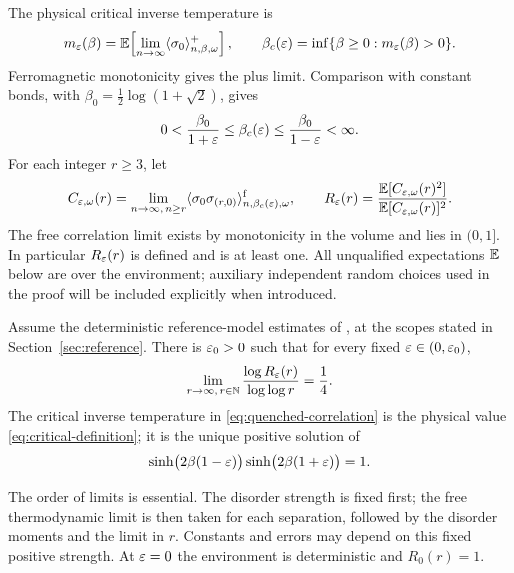 The physical critical inverse temperature is
\begin{equation}\label{eq:critical-definition}
 m_\varepsilon(\beta)=\mathbb E\!\left[\lim_{n\to\infty}
       \langle\sigma_0\rangle^+_{n,\beta,\omega}\right],
 \qquad
 \beta_c(\varepsilon)=\inf\{\beta\ge0:m_\varepsilon(\beta)>0\}.
\end{equation}
Ferromagnetic monotonicity gives the plus limit. Comparison with constant
bonds, with $\beta_0=\tfrac12\log(1+\sqrt2)$, gives
\[
 0<\frac{\beta_0}{1+\varepsilon}\le\beta_c(\varepsilon)
       \le\frac{\beta_0}{1-\varepsilon}<\infty.
\]
For each integer $r\ge3$, let
\begin{equation}\label{eq:quenched-correlation}
 C_{\varepsilon,\omega}(r)=\lim_{n\to\infty,\,n\ge r}
       \langle\sigma_0\sigma_{(r,0)}\rangle^{\mathrm f}
                   _{n,\beta_c(\varepsilon),\omega},
 \qquad
 R_\varepsilon(r)=\frac{\mathbb E[C_{\varepsilon,\omega}(r)^2]}
                 {\mathbb E[C_{\varepsilon,\omega}(r)]^2}.
\end{equation}
The free correlation limit exists by monotonicity in the volume and lies
in $(0,1]$. In particular $R_\varepsilon(r)$ is defined and is at least one.
All unqualified expectations $\mathbb E$ below are over the environment; auxiliary
independent random choices used in the proof will be included explicitly
when introduced.

\begin{theorem}\label{thm:main}
Assume the deterministic reference-model estimates of
\cite{ReferenceIsing}, at the scopes stated in Section~\ref{sec:reference}.
There is $\varepsilon_0>0$ such that for every fixed $\varepsilon\in(0,\varepsilon_0)$,
\begin{equation}\label{eq:main-limit}
 \lim_{r\to\infty,\,r\in\mathbb N}
       \frac{\log R_\varepsilon(r)}{\log\log r}=\frac14.
\end{equation}
The critical inverse temperature in \eqref{eq:quenched-correlation} is
the physical value \eqref{eq:critical-definition}; it is the unique positive
solution of
\begin{equation}\label{eq:critical-curve}
 \sinh\bigl(2\beta(1-\varepsilon)\bigr)
 \sinh\bigl(2\beta(1+\varepsilon)\bigr)=1.
\end{equation}
\end{theorem}

The order of limits is essential. The disorder strength is fixed first;
the free thermodynamic limit is then taken for each separation, followed
by the disorder moments and the limit in $r$. Constants and errors may
depend on this fixed positive strength. At $\varepsilon=0$ the environment is
deterministic and $R_0(r)=1$.

